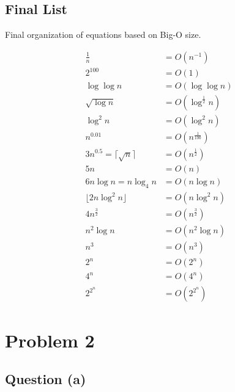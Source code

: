 \documentclass{article}
\begin{document}
\subsection{Final List}

Final organization of equations based on Big-O size.

\setcounter{equation}{0}
\begin{align}
    \frac{1}{n} &= O(n^{-1}) \\
    2^{100} &= O(1) \\
    \log \log n &= O(\log \log n) \\
    \sqrt{\log n} &= O(\log^{\frac{1}{2}}n) \\
    \log^2 n &= O(\log^2 n) \\
    n^{0.01} &= O(n^{\frac{1}{100}}) \\
    3n^{0.5} =
    \lceil \sqrt{n} \rceil &= O(n^{\frac{1}{2}}) \\
    5n &= O(n) \\
    6n\log n =
    n \log_4 n &= O(n \log n) \\
    \lfloor 2n \log^2n \rfloor &= O(n \log^2n) \\
    4n^{\frac{3}{2}} &= O(n^{\frac{3}{2}}) \\
    n^2 \log n &= O(n^2 \log n) \\
    n^3 &= O(n^3) \\
    2^n &= O(2^n) \\
    4^n &= O(4^n) \\
    2^{2^{n}} &= O(2^{2^{n}})
\end{align}

\section{Problem 2}
\subsection{Question (a)}
\end{document}
